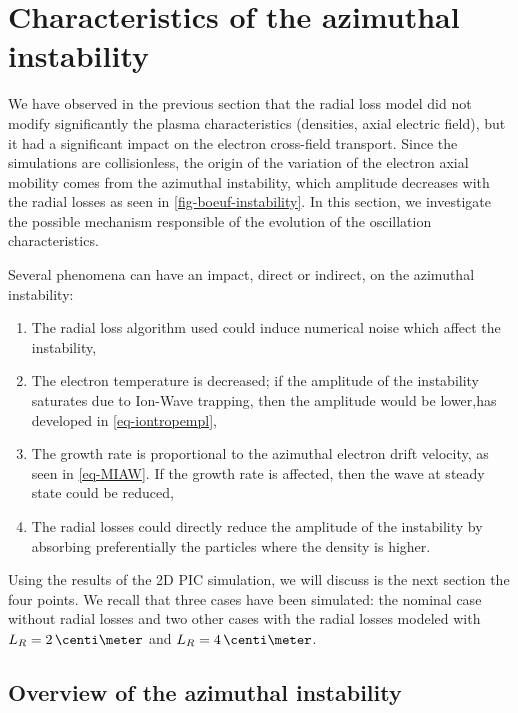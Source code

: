 
\FloatBarrier
\section{Characteristics of the azimuthal instability}
\label{sec-Ztheta-instability}

We have observed in the previous section that the radial loss model did not modify significantly the plasma characteristics (densities, axial electric field), but it had a significant impact on the electron cross-field transport.
Since the simulations are collisionless, the origin of the variation of the electron axial mobility comes from the azimuthal instability, which amplitude decreases with the radial losses as seen in \cref{fig-boeuf-instability}.
In this section, we investigate the possible mechanism responsible of the evolution of the oscillation characteristics.

Several phenomena can have an impact, direct or indirect, on the azimuthal instability\string:
\begin{enumerate}
  \item The radial loss algorithm used could induce numerical noise which affect the instability,
  \item The electron temperature is decreased\string; if the amplitude of the instability saturates due to Ion-Wave trapping, then the amplitude would be lower,has developed in \cref{eq-iontropempl},
  \item The growth rate is proportional to the azimuthal electron drift velocity, as seen in \cref{eq-MIAW}. If the growth rate is affected, then the wave at steady state could be reduced,
  \item The radial losses  could directly reduce the amplitude of the instability by absorbing preferentially the particles where the density is higher.
\end{enumerate}

Using the results of the \ac{2D} \ac{PIC} simulation, we will discuss is the next section the four points.
We recall that three cases have been simulated\string: the nominal case without radial losses and two other cases with the radial losses modeled with $L_R=2\,\centi\meter$ and $L_R=4\,\centi\meter$.



\subsection{Overview of the azimuthal instability} \label{subsec-azi_insta_Ztheta}

